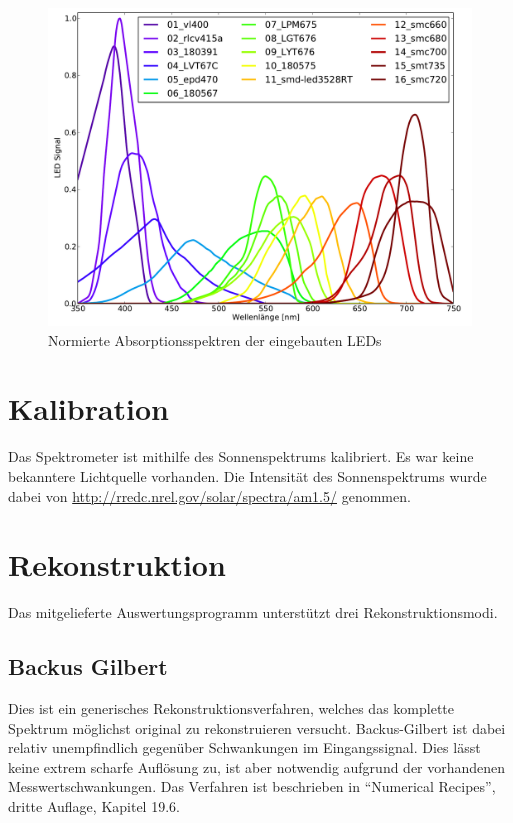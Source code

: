 \documentclass[a4paper, 12pt]{scrartcl}
\begin{document}
\begin{figure}[ht]
\centering
\includegraphics[width=\textwidth]{images/spektren.pdf}
\caption{Normierte Absorptionsspektren der eingebauten LEDs}
\end{figure}


\section{Kalibration}
Das Spektrometer ist mithilfe des Sonnenspektrums kalibriert. Es war keine bekanntere Lichtquelle vorhanden. Die Intensität des Sonnenspektrums wurde dabei von \url{http://rredc.nrel.gov/solar/spectra/am1.5/} genommen.


\section{Rekonstruktion}
Das mitgelieferte Auswertungsprogramm unterstützt drei Rekonstruktionsmodi.

\subsection{Backus Gilbert}
Dies ist ein generisches Rekonstruktionsverfahren, welches das komplette Spektrum möglichst original zu rekonstruieren versucht.
Backus-Gilbert ist dabei relativ unempfindlich gegenüber Schwankungen im Eingangssignal.
Dies lässt keine extrem scharfe Auflösung zu, ist aber notwendig aufgrund der vorhandenen Messwertschwankungen.
Das Verfahren ist beschrieben in "`Numerical Recipes"', dritte Auflage, Kapitel 19.6.
\end{document}
